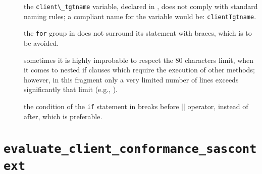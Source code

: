 \begin{description}
	
	\item []
		the \verb|client\_tgtname| variable, declared in , does not comply with standard naming rules; a compliant name for the variable would be: \verb|clientTgtname|.
	
	\item [] 
		the \verb|for| group in  does not surround its statement with braces, which is to be avoided.
	
	\item []
		sometimes it is highly improbable to respect the 80 characters limit, when it comes to nested if clauses which require the execution of other methods; however, in this fragment only a very limited number of lines exceeds significantly that limit (e.g., ).
	
	\item []
		the condition of the \verb|if| statement in  breaks before \verb|||| operator, instead of after, which is preferable.
	
\end{description}




















\section{\normalfont\texttt{evaluate\_client\_conformance\_sascontext}}


